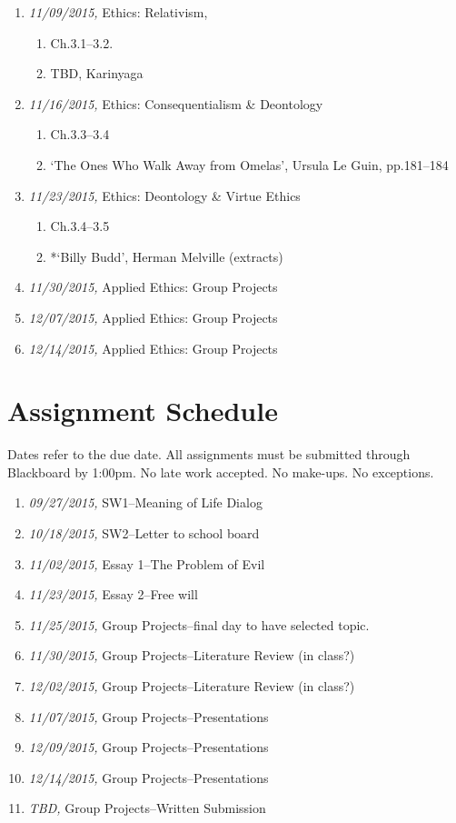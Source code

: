 \documentclass[11pt,article,oneside]{memoir}
\begin{document}
\begin{enumerate}
\item \textit{11/09/2015,} Ethics: Relativism, 
\begin{enumerate}
\item Ch.3.1--3.2.
\item TBD, Karinyaga
\end{enumerate}
\item \textit{11/16/2015,} Ethics: Consequentialism \& Deontology 
\begin{enumerate}
\item Ch.3.3--3.4
\item  `The Ones Who Walk Away from Omelas', Ursula Le Guin, pp.181--184 
\end{enumerate}
\item \textit{11/23/2015,} Ethics: Deontology \& Virtue Ethics
\begin{enumerate}
\item Ch.3.4--3.5
\item *`Billy Budd', Herman Melville (extracts)
\end{enumerate}
\item \textit{11/30/2015,} Applied Ethics: Group Projects
\item \textit{12/07/2015,} Applied Ethics: Group Projects
\item \textit{12/14/2015,} Applied Ethics: Group Projects
\end{enumerate}






\section{Assignment Schedule}
Dates refer to the due date. All assignments must be submitted through Blackboard by 1:00pm. No late work accepted. No make-ups. No exceptions. 

\begin{enumerate}
\item \textit{09/27/2015,} SW1--Meaning of Life Dialog
\item \textit{10/18/2015,} SW2--Letter to school board
\item \textit{11/02/2015,} Essay 1--The Problem of Evil
\item \textit{11/23/2015,} Essay 2--Free will
\item \textit{11/25/2015,} Group Projects--final day to have selected topic.
\item \textit{11/30/2015,} Group Projects--Literature Review (in class?)
\item \textit{12/02/2015,} Group Projects--Literature Review (in class?) 
\item \textit{11/07/2015,} Group Projects--Presentations
\item \textit{12/09/2015,} Group Projects--Presentations
\item \textit{12/14/2015,} Group Projects--Presentations
\item \textit{TBD,} Group Projects--Written Submission
\end{enumerate}




\end{document}
